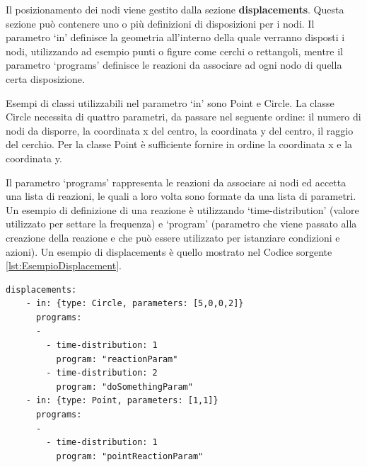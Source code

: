 Il posizionamento dei nodi viene gestito dalla sezione \textbf{displacements}. Questa sezione può contenere uno o più definizioni di disposizioni per i nodi.
Il parametro `in' definisce la geometria all'interno della quale verranno disposti i nodi, utilizzando ad esempio punti o figure come cerchi o rettangoli, mentre il parametro `programs' definisce le reazioni da associare ad ogni nodo di quella certa disposizione.

Esempi di classi utilizzabili nel parametro `in' sono Point e Circle.
La classe Circle necessita di quattro parametri, da passare nel seguente ordine: il numero di nodi da disporre, la coordinata x del centro, la coordinata y del centro, il raggio del cerchio. Per la classe Point è sufficiente fornire in ordine la coordinata x e la coordinata y.

Il parametro `programs' rappresenta le reazioni da associare ai nodi ed accetta una lista di reazioni, le quali a loro volta sono formate da una lista di parametri. Un esempio di definizione di una reazione è utilizzando `time-distribution' (valore utilizzato per settare la frequenza) e `program' (parametro che viene passato alla creazione della reazione e che può essere utilizzato per istanziare condizioni e azioni).
Un esempio di displacements è quello mostrato nel Codice sorgente \ref{lst:EsempioDisplacement}.
\medskip
\begin{lstlisting}[firstnumber=last,label={lst:EsempioDisplacement},caption={Disposizione nodi e reazioni associate}]
  displacements:
    - in: {type: Circle, parameters: [5,0,0,2]}
      programs:
      -
        - time-distribution: 1
          program: "reactionParam"
        - time-distribution: 2
          program: "doSomethingParam"
    - in: {type: Point, parameters: [1,1]}
      programs:
      -
        - time-distribution: 1
          program: "pointReactionParam"
\end{lstlisting}
